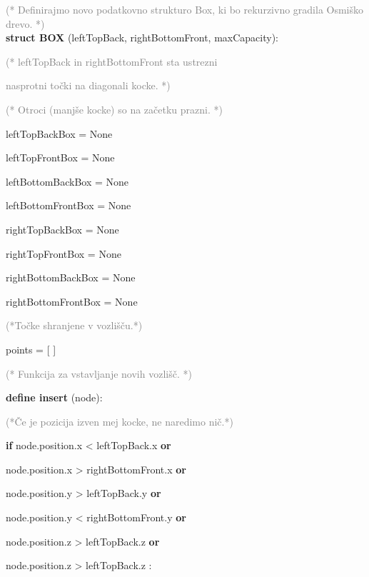 \documentclass[fleqn]{article}
\begin{document}
\vspace{3mm}
\noindent
\textcolor{gray}{(* Definirajmo novo podatkovno strukturo Box, ki bo rekurzivno gradila Osmiško drevo. *)} \\
\textbf{struct BOX} (leftTopBack, rightBottomFront, maxCapacity): 

\textcolor{gray}{(* leftTopBack in rightBottomFront sta ustrezni}

\textcolor{gray}{nasprotni točki na diagonali kocke. *)}

\vspace{3mm}
\textcolor{gray}{(* Otroci (manjše kocke) so na začetku prazni. *)} 

leftTopBackBox = None 

leftTopFrontBox = None 

leftBottomBackBox = None 

leftBottomFrontBox = None 

rightTopBackBox = None 

rightTopFrontBox = None 

rightBottomBackBox = None 

rightBottomFrontBox = None

\vspace{3mm}
\textcolor{gray}{(*Točke shranjene v vozlišču.*)} 

points = [ ]

\vspace{3mm}
\textcolor{gray}{(* Funkcija za vstavljanje novih vozlišč. *)} 

\textbf{define insert} (node):

\vspace{3mm}
\hspace{1cm} \textcolor{gray}{(*Če je pozicija izven mej kocke, ne naredimo nič.*)} 

\hspace{1cm}  \textbf{if} node.position.x < leftTopBack.x \textbf{or} 

\hspace{1.6cm}  node.position.x > rightBottomFront.x \textbf{or} 

\hspace{1.6cm} node.position.y > leftTopBack.y \textbf{or}

\hspace{1.6cm} node.position.y < rightBottomFront.y \textbf{or}

\hspace{1.6cm} node.position.z > leftTopBack.z \textbf{or}

\hspace{1.6cm} node.position.z > leftTopBack.z :
\end{document}
